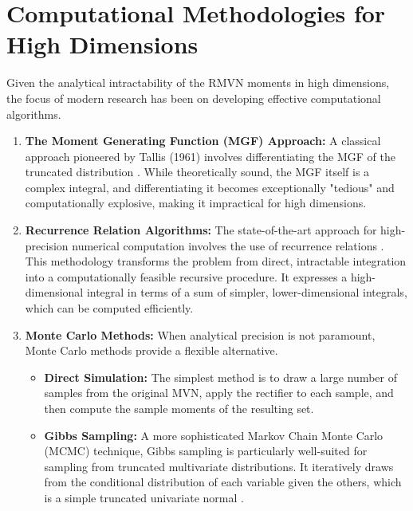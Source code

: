 \section{Computational Methodologies for High Dimensions}
\label{sec:computational_methods}

Given the analytical intractability of the RMVN moments in high dimensions, the focus of modern research has been on developing effective computational algorithms.
\begin{enumerate}
    \item \textbf{The Moment Generating Function (MGF) Approach:} A classical approach pioneered by Tallis (1961) involves differentiating the MGF of the truncated distribution \cite{Tallis1961MGF}. While theoretically sound, the MGF itself is a complex integral, and differentiating it becomes exceptionally "tedious" and computationally explosive, making it impractical for high dimensions.

    \item \textbf{Recurrence Relation Algorithms:} The state-of-the-art approach for high-precision numerical computation involves the use of recurrence relations \cite{KanRobotti2017TruncatedMoments}. This methodology transforms the problem from direct, intractable integration into a computationally feasible recursive procedure. It expresses a high-dimensional integral in terms of a sum of simpler, lower-dimensional integrals, which can be computed efficiently.

    \item \textbf{Monte Carlo Methods:} When analytical precision is not paramount, Monte Carlo methods provide a flexible alternative.
    \begin{itemize}
        \item \textbf{Direct Simulation:} The simplest method is to draw a large number of samples from the original MVN, apply the rectifier to each sample, and then compute the sample moments of the resulting set.
        \item \textbf{Gibbs Sampling:} A more sophisticated Markov Chain Monte Carlo (MCMC) technique, Gibbs sampling is particularly well-suited for sampling from truncated multivariate distributions. It iteratively draws from the conditional distribution of each variable given the others, which is a simple truncated univariate normal \cite{Geweke1991Gibbs}.
    \end{itemize}
\end{enumerate}

\ifdefined\ispartofbook
\else
  
  
\fi

